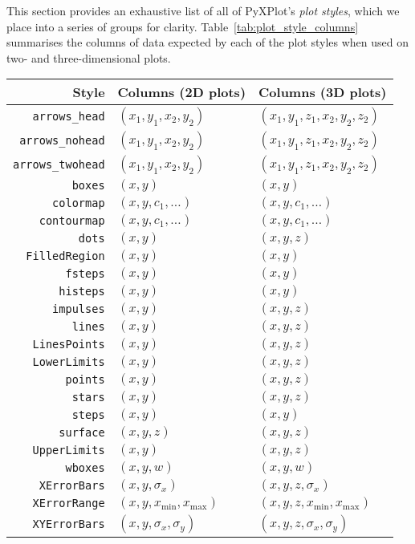 This section provides an exhaustive list of all of PyXPlot's {\it plot styles},
which we place into a series of groups for clarity.
Table~\ref{tab:plot_style_columns} summarises the columns of data expected by
each of the plot styles when used on two- and three-dimensional plots.

\begin{table}
\begin{tabular}{|rll|}
\hline
{\bf Style} & {\bf Columns (2D plots)} & {\bf Columns (3D plots)} \\
\hline
{\tt arrows\_head} & $(x_1,y_1,x_2,y_2)$ & $(x_1,y_1,z_1,x_2,y_2,z_2)$ \\
{\tt arrows\_nohead} & $(x_1,y_1,x_2,y_2)$ & $(x_1,y_1,z_1,x_2,y_2,z_2)$ \\
{\tt arrows\_twohead} & $(x_1,y_1,x_2,y_2)$ & $(x_1,y_1,z_1,x_2,y_2,z_2)$ \\
{\tt boxes} & $(x,y)$ & $(x,y)$ \\
{\tt colormap} & $(x,y,c_1,\ldots)$ & $(x,y,c_1,\ldots)$ \\
{\tt contourmap} & $(x,y,c_1,\ldots)$ & $(x,y,c_1,\ldots)$ \\
{\tt dots} & $(x,y)$ & $(x,y,z)$ \\
{\tt FilledRegion} & $(x,y)$ & $(x,y)$ \\
{\tt fsteps} & $(x,y)$ & $(x,y)$ \\
{\tt histeps} & $(x,y)$ & $(x,y)$ \\
{\tt impulses} & $(x,y)$ & $(x,y,z)$ \\
{\tt lines} & $(x,y)$ & $(x,y,z)$ \\
{\tt LinesPoints} & $(x,y)$ & $(x,y,z)$ \\
{\tt LowerLimits} & $(x,y)$ & $(x,y,z)$ \\
{\tt points} & $(x,y)$ & $(x,y,z)$ \\
{\tt stars} & $(x,y)$ & $(x,y,z)$ \\
{\tt steps} & $(x,y)$ & $(x,y)$ \\
{\tt surface} & $(x,y,z)$ & $(x,y,z)$ \\
{\tt UpperLimits} & $(x,y)$ & $(x,y,z)$ \\
{\tt wboxes} & $(x,y,w)$ & $(x,y,w)$ \\
{\tt XErrorBars} & $(x,y,\sigma_x)$ & $(x,y,z,\sigma_x)$ \\
{\tt XErrorRange} & $(x,y,x_\mathrm{min},x_\mathrm{max})$ & $(x,y,z,x_\mathrm{min},x_\mathrm{max})$ \\
{\tt XYErrorBars} & $(x,y,\sigma_x,\sigma_y)$ & $(x,y,z,\sigma_x,\sigma_y)$ \\

\end{tabular}
\end{table}
